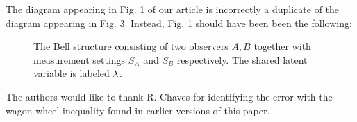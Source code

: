 \documentclass[aps, 10pt, english, twoside, pra, nofootinbib, tightenlines, longbibliography, superscriptaddress, notitlepage]{revtex4-1}
\begin{document}
    The diagram appearing in Fig. 1 of our article is incorrectly a duplicate of the diagram appearing in Fig. 3. Instead, Fig. 1 should have been been the following:
    \begin{figure}
        \centering
        \caption{The Bell structure consisting of two observers $A, B$ together with measurement settings $S_{A}$ and $S_{B}$ respectively. The shared latent variable is labeled $\lambda$.}
        \label{fig:bell_structure}
    \end{figure}




        The authors would like to thank R. Chaves for identifying the error with the wagon-wheel inequality found in earlier versions of this paper.

\end{document}
